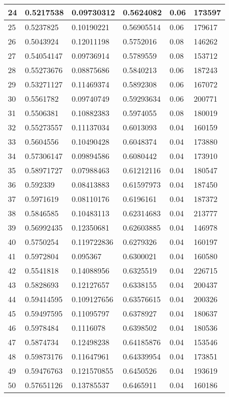 \begin{longtable}{|l|l|l|l|l|l|}
24 & 0.5217538 & 0.09730312 & 0.5624082 & 0.06 & 173597 \\ \hline 
25 & 0.5237825 & 0.10190221 & 0.56905514 & 0.06 & 179617 \\ \hline 
26 & 0.5043924 & 0.12011198 & 0.5752016 & 0.08 & 146262 \\ \hline 
27 & 0.54054147 & 0.09736914 & 0.5789559 & 0.08 & 153712 \\ \hline 
28 & 0.55273676 & 0.08875686 & 0.5840213 & 0.06 & 187243 \\ \hline 
29 & 0.53271127 & 0.11469374 & 0.5892308 & 0.06 & 167072 \\ \hline 
30 & 0.5561782 & 0.09740749 & 0.59293634 & 0.06 & 200771 \\ \hline 
31 & 0.5506381 & 0.10882383 & 0.5974055 & 0.08 & 180019 \\ \hline 
32 & 0.55273557 & 0.11137034 & 0.6013093 & 0.04 & 160159 \\ \hline 
33 & 0.5604556 & 0.10490428 & 0.6048374 & 0.04 & 173880 \\ \hline 
34 & 0.57306147 & 0.09894586 & 0.6080442 & 0.04 & 173910 \\ \hline 
35 & 0.58971727 & 0.07988463 & 0.61212116 & 0.04 & 180547 \\ \hline 
36 & 0.592339 & 0.08413883 & 0.61597973 & 0.04 & 187450 \\ \hline 
37 & 0.5971619 & 0.08110176 & 0.6196161 & 0.04 & 187372 \\ \hline 
38 & 0.5846585 & 0.10483113 & 0.62314683 & 0.04 & 213777 \\ \hline 
39 & 0.56992435 & 0.12350681 & 0.62603885 & 0.04 & 146978 \\ \hline 
40 & 0.5750254 & 0.119722836 & 0.6279326 & 0.04 & 160197 \\ \hline 
41 & 0.5972804 & 0.095367 & 0.6300021 & 0.04 & 160580 \\ \hline 
42 & 0.5541818 & 0.14088956 & 0.6325519 & 0.04 & 226715 \\ \hline 
43 & 0.5828693 & 0.12127657 & 0.6338155 & 0.04 & 200437 \\ \hline 
44 & 0.59414595 & 0.109127656 & 0.63576615 & 0.04 & 200326 \\ \hline 
45 & 0.59497595 & 0.11095797 & 0.6378927 & 0.04 & 180637 \\ \hline 
46 & 0.5978484 & 0.1116078 & 0.6398502 & 0.04 & 180536 \\ \hline 
47 & 0.5874734 & 0.12498238 & 0.64185876 & 0.04 & 153546 \\ \hline 
48 & 0.59873176 & 0.11647961 & 0.64339954 & 0.04 & 173851 \\ \hline 
49 & 0.59476763 & 0.121570855 & 0.6450526 & 0.04 & 193619 \\ \hline 
50 & 0.57651126 & 0.13785537 & 0.6465911 & 0.04 & 160186 \\ \hline 
\end{longtable}